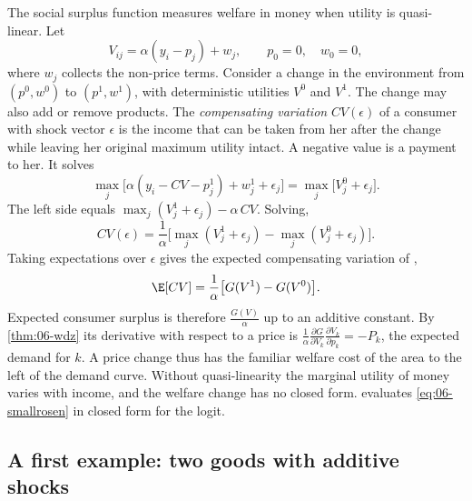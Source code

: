 The social surplus function measures welfare in money when utility is quasi-linear. Let
\begin{equation}\label{eq:06-quasilinear}
V_{ij} = \alpha(y_i - p_j) + w_j, \qquad p_0 = 0, \quad w_0 = 0,
\end{equation}
where $w_j$ collects the non-price terms. Consider a change in the environment from $(p^0, w^0)$ to
$(p^1, w^1)$, with deterministic utilities $V^0$ and $V^1$. The change may also add or remove products. The
\emph{compensating variation} $CV(\epsilon)$ of a consumer with shock vector $\epsilon$ is the income that can
be taken from her after the change while leaving her original maximum utility intact. A negative value is a
payment to her. It solves
\begin{equation*}
\max_j\big[\alpha(y_i - CV - p^1_j) + w^1_j + \epsilon_j\big] = \max_j\big[V^0_j + \epsilon_j\big].
\end{equation*}
The left side equals $\max_j(V^1_j + \epsilon_j) - \alpha\, CV$. Solving,
\begin{equation*}
CV(\epsilon) = \frac{1}{\alpha}\Big[\max_j(V^1_j + \epsilon_j) - \max_j(V^0_j + \epsilon_j)\Big].
\end{equation*}
Taking expectations over $\epsilon$ gives the expected compensating variation of \citet{SmallRosen1981},
\begin{equation}\label{eq:06-smallrosen}
\E[CV] = \frac{1}{\alpha}\big[G(V^1) - G(V^0)\big].
\end{equation}
Expected consumer surplus is therefore $\frac{G(V)}{\alpha}$ up to an additive constant. By
\cref{thm:06-wdz} its derivative with respect to a price is
$\frac{1}{\alpha}\frac{\partial G}{\partial V_k}\frac{\partial V_k}{\partial p_k} = -P_k$, the expected demand for
$k$. A price change thus has the familiar welfare cost of the area to the left of the demand curve. Without
quasi-linearity the marginal utility of money varies with income, and the welfare change has no closed form.
 evaluates \eqref{eq:06-smallrosen} in closed form for the logit.

\subsection{A first example: two goods with additive shocks}\label{sec:06-twogoods}

